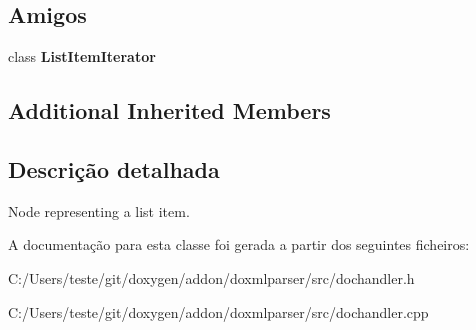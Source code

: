 \subsection*{Amigos}
\begin{DoxyCompactItemize}
\item 
\hypertarget{class_list_item_handler_a3a88ab28cd536f79e87cabca42245259}{class {\bfseries List\-Item\-Iterator}}\label{class_list_item_handler_a3a88ab28cd536f79e87cabca42245259}

\end{DoxyCompactItemize}
\subsection*{Additional Inherited Members}


\subsection{Descrição detalhada}
Node representing a list item. 



A documentação para esta classe foi gerada a partir dos seguintes ficheiros\-:\begin{DoxyCompactItemize}
\item 
C\-:/\-Users/teste/git/doxygen/addon/doxmlparser/src/dochandler.\-h\item 
C\-:/\-Users/teste/git/doxygen/addon/doxmlparser/src/dochandler.\-cpp\end{DoxyCompactItemize}
